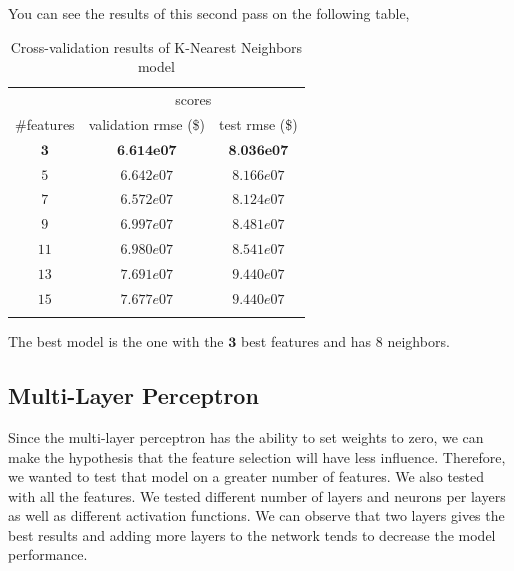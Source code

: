 You can see the results of this second pass on the following table,

\begin{table}[H]
	\centering
	\begin{tabular}{ccc} \toprule
	  & \multicolumn {2}{c}{scores} \\\cmidrule(lr) {2-3}
	  \#features         & validation rmse (\$)             & test rmse (\$) \\\hline
	  $\textbf{3}$        		& $\textbf{6.614e07}$                      	& $\textbf{8.036e07}$ \\
	  $5$        		& $6.642e07$                        & $8.166e07$ \\
	  $7$        		& $6.572e07$                        & $8.124e07$ \\
	  $9$             	& $6.997e07$                        & $8.481e07$ \\
	  $11$             	& $6.980e07$                        & $8.541e07$ \\
	  $13$             	& $7.691e07$                        & $9.440e07$ \\
	  $15$             	& $7.677e07$                        & $9.440e07$ \\
	  \\\hline
	\end{tabular}
	\caption{Cross-validation results of K-Nearest Neighbors model}
	\label{tab:knn-results}
\end{table}

The best model is the one with the $\textbf{3}$ best features and has $8$ neighbors.

\subsection{Multi-Layer Perceptron}

Since the multi-layer perceptron has the ability to set weights to zero, we can make the hypothesis that the feature selection will have less influence. Therefore, we wanted to test that model on a greater number of features. We also tested with all the features. We tested different number of layers and neurons per layers as well as different activation functions. We can observe that two layers gives the best results and adding more layers to the network tends to decrease the model performance.

